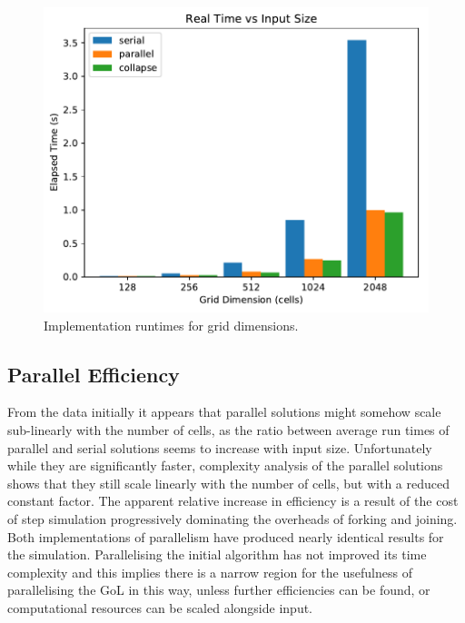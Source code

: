 \documentclass[]{article}
\begin{document}
\begin{figure}[h]
	\centering
	\includegraphics[width=.8\linewidth]{vecs/input_realtime.pdf}
	\caption{Implementation runtimes for grid dimensions.}
\end{figure}

\subsection{Parallel Efficiency}
From the data initially it appears that parallel solutions might somehow scale sub-linearly with the number of cells, as the ratio between average run times of parallel and serial solutions seems to increase with input size. Unfortunately while they are significantly faster, complexity analysis of the parallel solutions shows that they still scale linearly with the number of cells, but with a reduced constant factor. The apparent relative increase in efficiency is a result of the cost of step simulation progressively dominating the overheads of forking and joining. Both implementations of parallelism have produced nearly identical results for the simulation. Parallelising the initial algorithm has not improved its time complexity and this implies there is a narrow region for the usefulness of parallelising the GoL in this way, unless further efficiencies can be found, or computational resources can be scaled alongside input.
\end{document}
